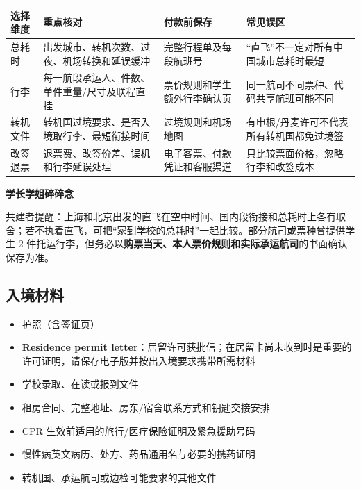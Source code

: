 \begin{table}[H]
  \centering
  \scriptsize
  \renewcommand{\arraystretch}{1.2}
  \setlength{\tabcolsep}{4pt}
  \begin{tabularx}{\textwidth}{
      p{}  %
      X  %
      p{}  %
      p{}  %
    }
    \toprule
    \textbf{选择维度} & \textbf{重点核对} & \textbf{付款前保存} & \textbf{常见误区} \\
    \midrule
    总耗时 & 出发城市、转机次数、过夜、机场转换和延误缓冲 & 完整行程单及每段航班号 & “直飞”不一定对所有中国城市总耗时最短 \\
    行李 & 每一航段承运人、件数、单件重量/尺寸及联程直挂 & 票价规则和学生额外行李确认页 & 同一航司不同票种、代码共享航班可能不同 \\
    转机文件 & 转机国过境要求、是否入境取行李、最短衔接时间 & 过境规则和机场地图 & 有申根/丹麦许可不代表所有转机国都免过境签 \\
    改签退票 & 退票费、改签价差、误机和行李延误处理 & 电子客票、付款凭证和客服渠道 & 只比较票面价格，忽略行李和改签成本 \\
    \bottomrule
  \end{tabularx}
\end{table}

\begin{grayleftbox}\textbf{学长学姐碎碎念}
\experiencenotice

共建者提醒：上海和北京出发的直飞在空中时间、国内段衔接和总耗时上各有取舍；若不执着直飞，可把“家到学校的总耗时”一起比较。部分航司或票种曾提供学生 2 件托运行李，但务必以\textbf{购票当天、本人票价规则和实际承运航司}的书面确认保存为准。
\end{grayleftbox}

\subsection{入境材料}

\begin{itemize}[label=•, itemsep=2pt, leftmargin=2em]
  \item 护照（含签证页）
  \item \textbf{Residence permit letter}：居留许可获批信；在居留卡尚未收到时是重要的许可证明，请保存电子版并按出入境要求携带所需材料
  \item 学校录取、在读或报到文件
  \item 租房合同、完整地址、房东/宿舍联系方式和钥匙交接安排
  \item CPR 生效前适用的旅行/医疗保险证明及紧急援助号码
  \item 慢性病英文病历、处方、药品通用名与必要的携药证明
  \item 转机国、承运航司或边检可能要求的其他文件
\end{itemize}

